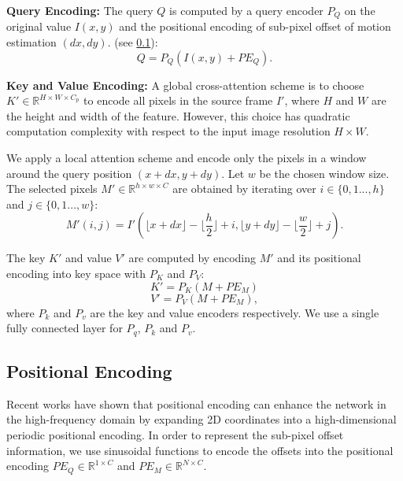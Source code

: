 \documentclass[10pt,twocolumn,letterpaper]{article}
\begin{document}
\vspace{0.5em}

\noindent\textbf{Query Encoding:}
The query $Q$ is computed by a query encoder $P_Q$ on the original value $I(x,y)$ and the positional encoding of sub-pixel offset of motion estimation $(dx, dy)$.  (see \cref{sec:method_pe}):  
\begin{equation}
    Q = P_Q\left(I(x,y) + PE_Q\right).
\end{equation}

\vspace{0.5em}
\noindent\textbf{Key and Value Encoding:}
A global cross-attention scheme is to choose $K' \in \mathbb{R}^{H \times W \times C_p}$ to encode all pixels in the source frame $I'$, where $H$ and $W$ are the height and width of the feature. However, this choice has quadratic computation complexity with respect to the input image resolution $H \times W$.

We apply a local attention scheme and encode only the pixels in a window around the query position $(x+dx, y+dy)$. Let $w$ be the chosen window size. The selected pixels $M'\in \mathbb{R}^{h \times w \times C}$ are obtained by iterating over $i \in \{0,1...,h\}$ and $j \in \{0,1...,w\}$:
\begin{equation}
    M'(i, j)=I'(\lfloor x+dx \rfloor - \lfloor \frac{h}{2} \rfloor + i,\lfloor y+dy \rfloor -\lfloor \frac{w}{2} \rfloor + j).
\end{equation}

The key $K'$ and value $V'$ are computed by encoding $M'$ and its positional encoding into key space with $P_K$ and $P_V$:
\begin{equation}
     K'= P_K(M + PE_M) 
\end{equation}
\begin{equation}
     V'= P_V(M + PE_M),   
\end{equation}
where $P_k$ and $P_v$ are the key and value encoders respectively. We use a single fully connected layer for $P_q$, $P_k$ and $P_v$.


\subsection{Positional Encoding}\label{sec:method_pe}
Recent works \cite{xu2021ultrasr, mildenhall2021nerf} have shown that positional encoding can enhance the network in the high-frequency domain by expanding 2D coordinates into a high-dimensional periodic positional encoding.
In order to represent the sub-pixel offset information, we use sinusoidal functions to encode the offsets into the positional encoding $PE_Q \in \mathbb{R}^{1 \times C}$ and $PE_M\in \mathbb{R}^{N \times C}$.
\end{document}
